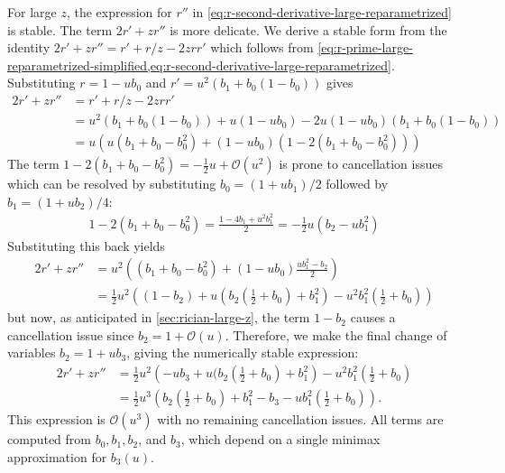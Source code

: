 \documentclass{article}
\begin{document}
For large $z$, the expression for $r''$ in \cref{eq:r-second-derivative-large-reparametrized} is stable.
The term $2r'+zr''$ is more delicate.
We derive a stable form from the identity $2r' + zr'' = r' + r/z - 2zrr'$ which follows from \cref{eq:r-prime-large-reparametrized-simplified,eq:r-second-derivative-large-reparametrized}.
Substituting $r=1-ub_0$ and $r'=u^2(b_1+b_0(1-b_0))$ gives
%
\begin{align}
  2r' + zr'' & = r' + r/z - 2zrr'                                              \\
             & = u^2 (b_1+b_0(1-b_0)) + u(1-ub_0) - 2u(1-ub_0)(b_1+b_0(1-b_0)) \\
             & = u ( u(b_1+b_0-b_0^2) + (1-ub_0)(1 - 2(b_1+b_0-b_0^2)) )
\end{align}
%
The term $1-2(b_1+b_0-b_0^2) = -\frac{1}{2}u + \mathcal{O}(u^2)$ is prone to cancellation issues which can be resolved by substituting $b_0=(1+ub_1)/2$ followed by $b_1=(1+ub_2)/4$:
%
\begin{align}
  1-2(b_1+b_0-b_0^2) = \frac{1-4b_1+u^2 b_1^2}{2} = -\frac{1}{2}u(b_2 - u b_1^2)
\end{align}
%
Substituting this back yields
%
\begin{align}
  2r' + zr'' & = u^2 \left( (b_1+b_0-b_0^2) + (1-ub_0)\frac{u b_1^2 - b_2}{2} \right)                                          \\
             & = \frac{1}{2} u^2 \left( (1-b_2) + u (b_2 (\frac{1}{2}+b_0 ) + b_1^2 ) - u^2 b_1^2 (\frac{1}{2} + b_0 ) \right)
\end{align}
%
but now, as anticipated in \cref{sec:rician-large-z}, the term $1-b_2$ causes a cancellation issue since $b_2 = 1 + \mathcal{O}(u)$.
Therefore, we make the final change of variables $b_2 = 1 + u b_3$, giving the numerically stable expression:
%
\begin{align}
  2r' + zr'' & = \frac{1}{2} u^2 \left( -u b_3 + u (b_2 (\frac{1}{2}+b_0 ) + b_1^2 \right) - u^2 b_1^2 ( \frac{1}{2} + b_0 )                                     \\
             & = \frac{1}{2} u^3 \left( b_2 (\frac{1}{2}+b_0 ) + b_1^2 - b_3 - u b_1^2 (\frac{1}{2} + b_0) \right). \label{eq:two-rprime-z-r-primeprime-large-z}
\end{align}
%
This expression is $\mathcal{O}(u^3)$ with no remaining cancellation issues.
All terms are computed from $b_0, b_1, b_2$, and $b_3$, which depend on a single minimax approximation for $b_3(u)$.
\end{document}
